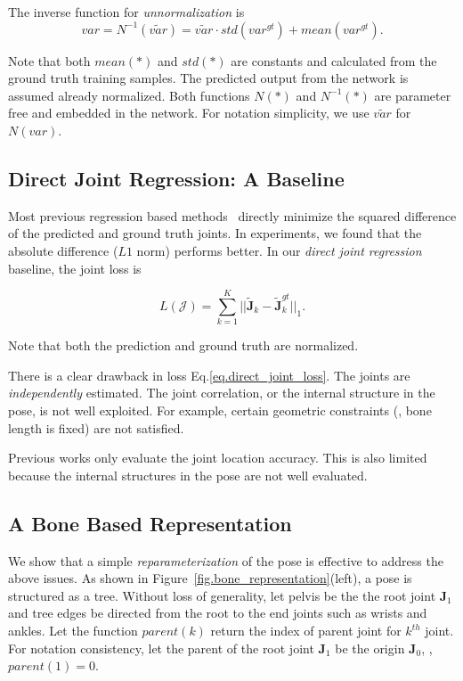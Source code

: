 \documentclass[10pt,twocolumn,letterpaper]{article}
\begin{document}
The inverse function for \emph{unnormalization} is
\begin{equation}
var=N^{-1}(\tilde{var}) = \tilde{var}\cdot std(var^{gt})+mean(var^{gt}).
\label{eq.unnormalization}
\end{equation}

Note that both $mean(*)$ and $std(*)$ are constants and calculated from the ground truth training samples. The predicted output from the network is assumed already normalized. Both functions $N(*)$ and $N^{-1}(*)$ are parameter free and embedded in the network. For notation simplicity, we use $\tilde{var}$ for $N(var)$.

\subsection{Direct Joint Regression: A Baseline}
\label{sec.direct_joint_regression}

Most previous regression based methods~\cite{carreira2016human,zhou2016deep,park20163d,tekin2016structured,tekin2016direct} directly minimize the squared difference of the predicted and ground truth joints. In experiments, we found that the absolute difference ($L1$ norm) performs better. In our \emph{direct joint regression} baseline, the joint loss is

\begin{equation}
L(\mathcal{J}) = \sum_{k=1}^K ||\tilde{\mathbf{J}}_k - \tilde{\mathbf{J}}_k^{gt}||_1.
\label{eq.direct_joint_loss}
\end{equation}

Note that both the prediction and ground truth are normalized.

There is a clear drawback in loss Eq.\eqref{eq.direct_joint_loss}. The joints are \emph{independently} estimated. The joint correlation, or the internal structure in the pose, is not well exploited. For example, certain geometric constraints (\eg, bone length is fixed) are not satisfied.

Previous works only evaluate the joint location accuracy. This is also limited because the internal structures in the pose are not well evaluated.

\subsection{A Bone Based Representation}
\label{sec.bon_representation}

We show that a simple \emph{reparameterization} of the pose is effective to address the above issues. As shown in Figure~\ref{fig.bone_representation}(left), a pose is structured as a tree. Without loss of generality, let pelvis be the the root joint $\mathbf{J}_1$ and tree edges be directed from the root to the end joints such as wrists and ankles. Let the function $parent(k)$ return the index of parent joint for $k^{th}$ joint. For notation consistency, let the parent of the root joint $\mathbf{J}_1$ be the origin $\mathbf{J}_0$, \ie, $parent(1)=0$.
\end{document}
